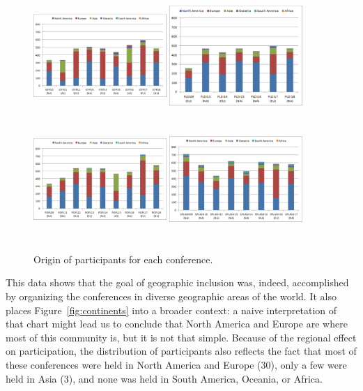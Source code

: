 \begin{figure}
  \centering
  \includegraphics[width=0.45\textwidth,height=1.8in]{figs/ParticipantsOriginICFP.pdf}
  \includegraphics[width=0.45\textwidth,height=1.8in]{figs/ParticipantsOriginPLDI.pdf}
  \includegraphics[width=0.45\textwidth,height=1.8in]{figs/ParticipantsOriginPOPL.pdf}
  \includegraphics[width=0.45\textwidth,height=1.8in]{figs/ParticipantsOriginSPLASH.pdf}
  \caption{Origin of participants for each conference.}
  \label{fig:continents_per_conference}
\end{figure}


This data shows that the goal of geographic inclusion was, indeed, accomplished by organizing the conferences in diverse geographic areas of the world. It also places Figure~\ref{fig:continents} into a broader context: a naive interpretation of that chart might lead us to conclude that North America and Europe are where most of this community is, but it is not that simple. Because of the regional effect on participation, the distribution of participants also reflects the fact that most of these conferences were held in North America and Europe (30), only a few were held in Asia (3), and none was held in South America, Oceania, or Africa.


